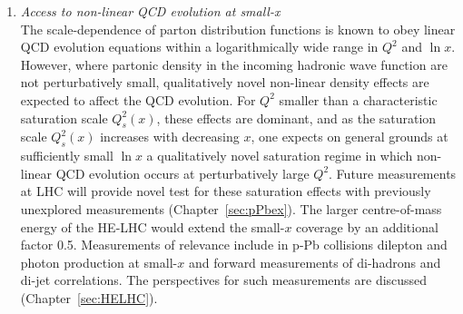 \documentclass[../report.tex]{subfiles}
\begin{document}
\begin{enumerate}
\item {\it Access to non-linear QCD evolution at small-x}\\ The scale-dependence of parton distribution functions is known to obey linear QCD evolution equations within a logarithmically wide range in $Q^2$ and $\ln x$. However, where partonic density in the incoming hadronic wave function are not perturbatively small, qualitatively novel non-linear density effects are expected to affect the QCD evolution. For $Q^2$ smaller than a characteristic saturation scale $Q^2_s(x)$, these effects are dominant, and as the saturation scale $Q^2_s(x)$ increases with decreasing $x$, one expects on general grounds at sufficiently small $\ln x$ a qualitatively novel saturation regime in which non-linear QCD evolution occurs at perturbatively large $Q^2$. Future measurements at LHC will provide novel test for these saturation effects with previously unexplored measurements (Chapter~\ref{sec:pPbex}). The larger centre-of-mass energy of the HE-LHC would extend the small-$x$ coverage by an additional factor 0.5. Measurements of relevance include in p-Pb collisions dilepton and photon production at small-$x$ and forward measurements of di-hadrons and di-jet correlations. The perspectives for such measurements are discussed (Chapter~\ref{sec:HELHC}). 
\end{enumerate}
\end{document}
